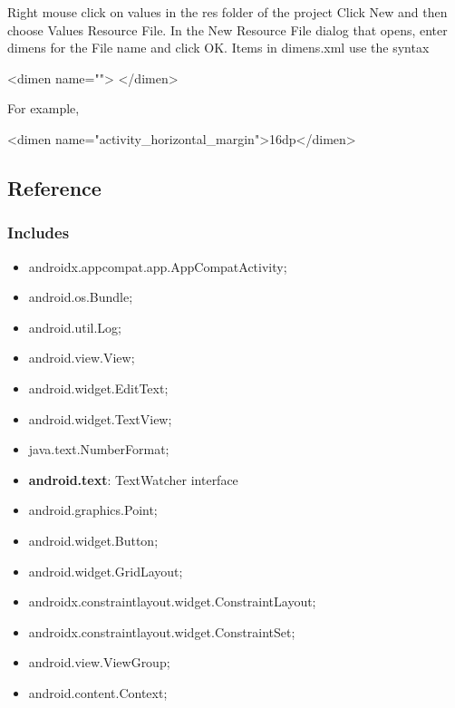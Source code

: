 \documentclass{report}
\begin{document}
\begin{itemize}
            \bigbreak \noindent 
            Right mouse click on values in the res folder of the project
            \bigbreak \noindent 
            Click New and then choose Values Resource File.
            \bigbreak \noindent 
            In the New Resource File dialog that opens, enter dimens for the File name and click OK.
            \bigbreak \noindent 
            Items in dimens.xml use the syntax
            \bigbreak \noindent 
            \begin{xmlcode}
            <dimen name=""> </dimen>
            \end{xmlcode}
            \bigbreak \noindent 
            For example,
            \bigbreak \noindent 
            \begin{xmlcode}
                <dimen name="activity_horizontal_margin">16dp</dimen>
            \end{xmlcode}
    \end{itemize}


    \pagebreak 
    \subsection{Reference}
    \bigbreak \noindent 
    \subsubsection{Includes}
    \begin{itemize}
        \item androidx.appcompat.app.AppCompatActivity;
        \item android.os.Bundle;
        \item android.util.Log;
        \item android.view.View;
        \item android.widget.EditText;
        \item android.widget.TextView;
        \item java.text.NumberFormat;
        \item \textbf{android.text}: TextWatcher interface
        \item android.graphics.Point;
        \item android.widget.Button;
        \item android.widget.GridLayout;
        \item androidx.constraintlayout.widget.ConstraintLayout;
        \item androidx.constraintlayout.widget.ConstraintSet;
        \item android.view.ViewGroup;
        \item android.content.Context;
    \end{itemize}
\end{document}
